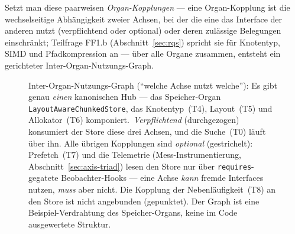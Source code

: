 \begin{nurlang}
Setzt man diese paarweisen \emph{Organ-Kopplungen} --- eine Organ-Kopplung ist die wechselseitige
Abhängigkeit zweier Achsen, bei der die eine das Interface der anderen nutzt (verpflichtend oder
optional) oder deren zulässige Belegungen einschränkt; Teilfrage FF1.b (Abschnitt~\ref{sec:rqs})
spricht sie für Knotentyp, SIMD und Pfadkompression an --- über alle Organe zusammen, entsteht ein
gerichteter Inter-Organ-Nutzungs-Graph.
\begin{figure}[htbp]\centering
\caption{Inter-Organ-Nutzungs-Graph (\enquote{welche Achse nutzt welche}): Es gibt genau \emph{einen}
kanonischen Hub --- das Speicher-Organ \texttt{LayoutAwareChunkedStore}, das Knotentyp~(T4), Layout~(T5)
und Allokator~(T6) komponiert.\ \emph{Verpflichtend} (durchgezogen) konsumiert der Store diese drei Achsen,
und die Suche~(T0) läuft über ihn. Alle übrigen Kopplungen sind \emph{optional} (gestrichelt): Prefetch~(T7)
und die Telemetrie (Mess-Instrumentierung, Abschnitt~\ref{sec:axis-triad}) lesen den Store nur über \texttt{requires}-gegatete Beobachter-Hooks --- eine Achse
\emph{kann} fremde Interfaces nutzen, \emph{muss} aber nicht. Die Kopplung der Nebenläufigkeit~(T8) an den
Store ist nicht angebunden (gepunktet). Der Graph ist eine Beispiel-Verdrahtung des Speicher-Organs,
keine im Code ausgewertete Struktur.}\label{fig:usage}
\end{figure}

\end{nurlang}
